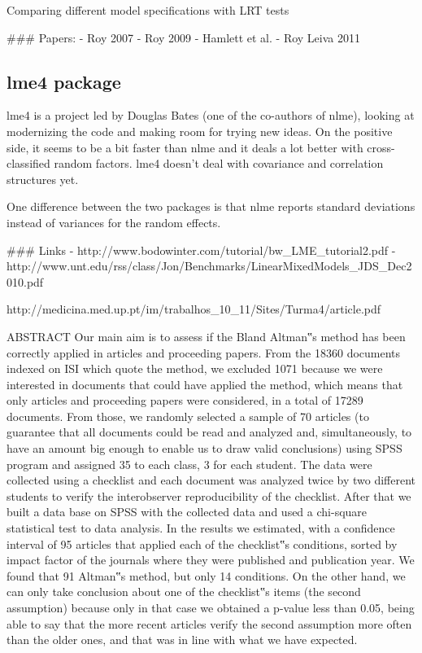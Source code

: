 Comparing different model specifications with LRT tests

### Papers:
- Roy 2007
- Roy 2009
- Hamlett et al.
- Roy Leiva 2011


\newpage
\subsection*{lme4 package}

lme4 is a project led by Douglas Bates (one of the co-authors of nlme), looking at modernizing the code and
making room for trying new ideas. On the positive side, it seems to be a bit faster than nlme and it deals 
a lot better with cross-classified random factors. lme4 doesn’t deal with covariance and correlation structures yet.

One difference between the two packages is that nlme reports standard deviations instead of variances for
the random effects.

### Links 
- http://www.bodowinter.com/tutorial/bw_LME_tutorial2.pdf
- http://www.unt.edu/rss/class/Jon/Benchmarks/LinearMixedModels_JDS_Dec2010.pdf

\newpage
http://medicina.med.up.pt/im/trabalhos_10_11/Sites/Turma4/article.pdf


ABSTRACT
Our main aim is to assess if the Bland Altman‟s method has been correctly applied in articles and
proceeding papers. From the 18360 documents indexed on ISI which quote the method, we excluded
1071 because we were interested in documents that could have applied the method, which means
that only articles and proceeding papers were considered, in a total of 17289 documents. From those,
we randomly selected a sample of 70 articles (to guarantee that all documents could be read and
analyzed and, simultaneously, to have an amount big enough to enable us to draw valid conclusions)
using SPSS program and assigned 35 to each class, 3 for each student. The data were collected
using a checklist and each document was analyzed twice by two different students to verify the interobserver
reproducibility of the checklist. After that we built a data base on SPSS with the collected
data and used a chi-square statistical test to data analysis. In the results we estimated, with a
confidence interval of 95%
articles that applied each of the checklist‟s conditions, sorted by impact factor of the journals where
they were published and publication year. We found that 91%
Altman‟s method, but only 14%
conditions. On the other hand, we can only take conclusion about one of the checklist‟s items (the
second assumption) because only in that case we obtained a p-value less than 0.05, being able to
say that the more recent articles verify the second assumption more often than the older ones, and
that was in line with what we have expected.

